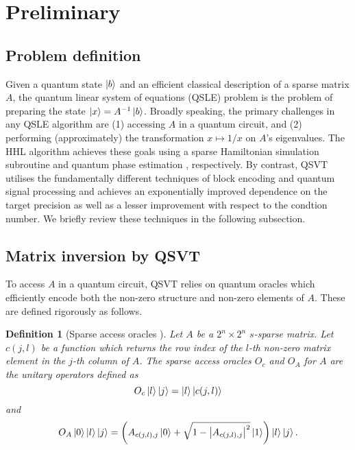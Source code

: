 \documentclass[10pt, twocolumn]{article}
\newtheorem{definition}[theorem]{Definition}
\begin{document}
\section{Preliminary}

\subsection{Problem definition}

Given a quantum state $\ket{b}$ and an efficient classical description of a sparse matrix $A$, the quantum linear system of equations (QSLE) problem is the problem of preparing the state $\ket{x} = A^{-1} \ket{b}$. Broadly speaking, the primary challenges in any QSLE algorithm are (1) accessing $A$ in a quantum circuit, and (2) performing (approximately) the transformation $x \mapsto 1/x$ on $A$'s eigenvalues. The HHL algorithm \cite{harrow2009quantum} achieves these goals using a sparse Hamiltonian simulation subroutine \cite{berry2007efficient} and quantum phase estimation \cite{kitaev1995quantum}, respectively. By contrast, QSVT utilises the fundamentally different techniques of block encoding \cite{gilyen2019quantum} and quantum signal processing \cite{low2017optimal} and achieves an exponentially improved dependence on the target precision as well as a lesser improvement with respect to the condtion number. We briefly review these techniques in the following subsection.

\subsection{Matrix inversion by QSVT}

To access $A$ in a quantum circuit, QSVT relies on quantum oracles which efficiently encode both the non-zero structure and non-zero elements of $A$. These are defined rigorously as follows.

\begin{definition}[Sparse access oracles \cite{camps2203explicit}]
	\label{def::sparse_access_oracles}
	Let $A$ be a $2^n \times 2^n$ $s$-sparse matrix. Let $c(j,l)$ be a function which returns the row index of the $l$-th non-zero matrix element in the $j$-th column of $A$. The sparse access oracles $O_c$ and $O_A$ for $A$ are the unitary operators defined as
	\[
		O_c \ket{l}\ket{j} = \ket{l}\ket{c(j, l)}
	\]
	and
	\[
		O_A \ket{0}\ket{l}\ket{j} = \left( A_{c(j, l), j} \ket{0} + \sqrt{1 - \abs{A_{c(j, l), j}}^2 } \ket{1} \right) \ket{l} \ket{j}.
	\]
\end{definition}
\end{document}
